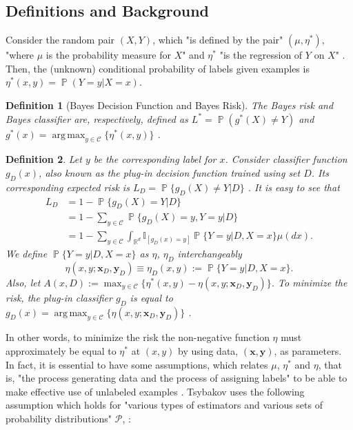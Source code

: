 \documentclass[10pt,twocolumn]{IEEEtran}
\newtheorem{definition}{Definition}
\DeclareMathOperator*{\argmax}{arg\,max}
\DeclareMathOperator{\P}{\mathbb{P}}
\begin{document}
	\subsection{Definitions and Background}
	Consider the random pair $(X, Y)$, which "is defined by the pair" $(\mu, \eta^*)$, "where $\mu$ is the probability measure for $X$" and $\eta^*$ "is the regression of $Y$ on $X$" \cite{devroye1996probabilistic}. Then, the (unknown) conditional probability of labels given examples is $\eta^*(x, y) = \P(Y = y|X = x)$.
	
	\begin{definition}[Bayes Decision Function and Bayes Risk]
		The Bayes risk and Bayes classifier are, respectively, defined as $L^* = \P(g^*(X) \neq Y)$ and $g^*(x) = \argmax_{y \in \mathcal{C}}\{\eta^*(x, y)\}$ \cite{devroye1996probabilistic, chen2006consistency}.
	\end{definition}
	
	\begin{definition}
		Let $y$ be the corresponding label for $x$. Consider classifier function $g_D(x)$, also known as the plug-in decision function trained using set $D$. Its corresponding expected risk is $L_D = \P\{g_D(X) \neq Y|D\}$ \cite{devroye1996probabilistic}. It is easy to see that
		\begin{align}
			L_D &= 1 - \P\{g_D(X) = Y|D\} \\
			&= 1 - \sum_{y \in \mathcal{C}} \P\{g_D(X) = y, Y = y|D\} \\
			&= 1 - \sum_{y \in \mathcal{C}} \int_{\mathbb{R}^d} \mathbb{I}_{[g_D(x)=y]} \P\{Y = y|D, X = x\} \mu(dx).
		\end{align}
		We define $\P\{Y = y|D, X = x\}$ as $\eta$, $\eta_D$ interchangeably
		\begin{equation}
			\eta(x, y; \mathbf{x}_D, \mathbf{y}_D) \equiv \eta_D(x, y) := \P\{Y = y|D, X = x\}.
		\end{equation}
		Also, let $A(x, D) := \max_{y \in \mathcal{C}}\{\eta^*(x, y) - \eta(x, y; \mathbf{x}_D, \mathbf{y}_D)\}$. To minimize the risk, the plug-in classifier $g_D$ is equal to $g_D(x) = \argmax_{y \in \mathcal{C}}\{\eta(x, y; \mathbf{x}_D, \mathbf{y}_D)\}$ \cite{chen2006consistency}.
	\end{definition}
	
	In other words, to minimize the risk the non-negative function $\eta$ must approximately be equal to $\eta^*$ at $(x, y)$ by using data, $(\mathbf{x}, \mathbf{y})$, as parameters. In fact, it is essential to have some assumptions, which relates $\mu$, $\eta^*$ and $\eta$, that is, "the process generating data and the process of assigning labels" \cite{sinha2009semi} to be able to make effective use of unlabeled examples \cite{singh2009unlabeled}. Tsybakov uses the following assumption which holds for "various types of estimators and various sets of probability distributions" $\mathcal{P}$, \cite{devroye1996probabilistic, audibert2007fast}:
	
\end{document}
